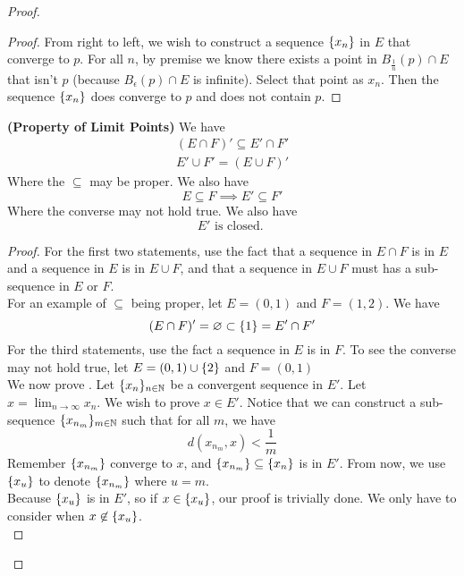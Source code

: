 \documentclass{report}
\begin{document}
\begin{proof}
\begin{proof}
From right to left, we wish to construct a sequence $\{ x_n \}$ in $E$ that converge to $p$. For all $n$, by premise we know there exists a point in  $B_{\frac{1}{n}}(p)\cap E$ that isn't $p$  (because $B_{\epsilon }(p)\cap E$ is infinite). Select that point as $x_n$. Then the sequence $\{ x_n \}$ does converge to $p$ and does not contain $p$.
\end{proof}
\begin{theorem}
\label{3.2.10}
\textbf{(Property of Limit Points)} We have
\begin{gather}
(E\cap F)'\subseteq E'\cap F'\\
E'\cup F'=(E\cup F)'
\end{gather}
Where the $\subseteq$ may be proper. We also have
\begin{equation}
E\subseteq F\implies E'\subseteq F'
\end{equation}
Where the converse may not hold true. We also have
\begin{equation}
E'\text{ is closed. }
\end{equation}
\end{theorem}
\begin{proof}
For the first two statements, use the fact that a sequence in $E\cap F$ is in $E$ and a sequence in  $E$ is in $E\cup F$, and that a sequence in $E\cup F$ must has a sub-sequence in $E$ or $F$.\\

For an example of $\subseteq$ being proper, let $E=(0,1)$ and $F=(1,2)$. We have 
\begin{equation}
  (E\cap F)'=\varnothing \subset \{ 1 \}=E'\cap F'
\end{equation}
For the third statements, use the fact a sequence in $E$ is in $F$. To see the converse may not hold true, let $E=(0,1)\cup \{ 2 \}$ and $F=(0,1)$\\

We now prove . Let $\{ x_n \}_{n\in\mathbb{N}}$ be a convergent sequence in $E'$. Let $x=\lim_{n\to\infty} x_n$. We wish to prove $x\in E'$. Notice that we can construct a sub-sequence $\{ x_{n_m} \}_{m \in\mathbb{N}}$ such that for all $m$, we have 
 \begin{equation}
d(x_{n_m},x)<\frac{1}{m}
\end{equation}
Remember $\{ x_{n_m} \}$ converge to $x$, and $\{ x_{n_m} \}\subseteq \{ x_n \}$ is in $E'$. From now, we use $\{ x_u \}$ to denote $\{ x_{n_m} \}$ where $u=m$.\\ 

Because $\{ x_u \}$ is in $E'$, so if  $x\in \{ x_u \}$, our proof is trivially done. We only have to consider when $x\not\in \{ x_u \}$.\\


\end{proof}
\end{proof}
\end{document}
